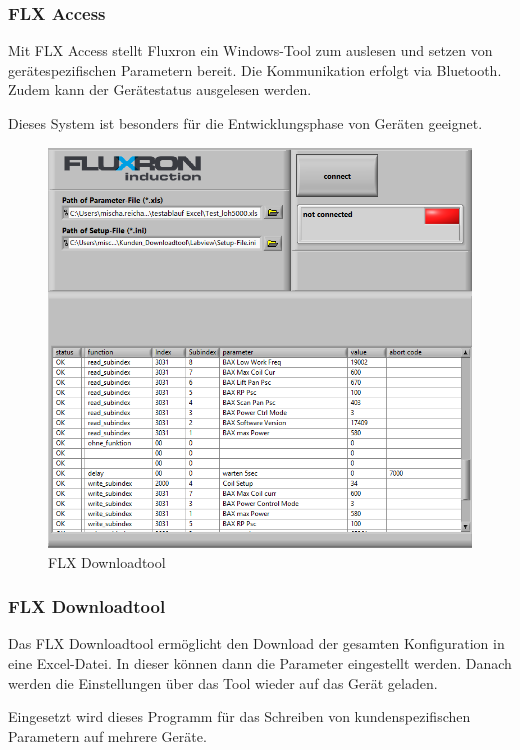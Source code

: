 \subsubsection{FLX Access}
\label{subsubsec:FLX Access}

Mit FLX Access stellt Fluxron ein Windows-Tool zum auslesen und setzen von gerätespezifischen Parametern bereit. Die Kommunikation erfolgt via Bluetooth. Zudem kann der Gerätestatus ausgelesen werden. 

Dieses System ist besonders für die Entwicklungsphase von Geräten geeignet.

\vspace{2cm}
\WFclear
\begin{figure}
	\includegraphics[scale=0.25]{analysis/res/flxdltool}
	\caption{FLX Downloadtool}
\end{figure}

\subsubsection{FLX Downloadtool}
\label{subsubsec:FLX Downloadtool}

Das FLX Downloadtool ermöglicht den Download der gesamten Konfiguration in eine Excel-Datei. In dieser können dann die Parameter eingestellt werden. Danach werden die Einstellungen über das Tool wieder auf das Gerät geladen.

Eingesetzt wird dieses Programm für das Schreiben von kundenspezifischen Parametern auf mehrere Geräte.
\WFclear
